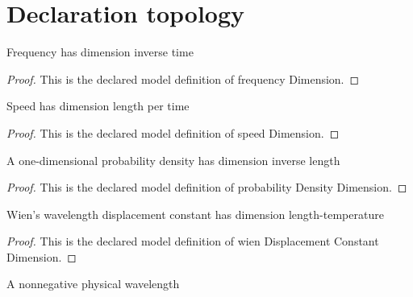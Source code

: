 \section{Declaration topology}
\begin{definition}
  \label{def:physics:phyx-mini-0646:phyxminiproblems-problemphyxmini0646-frequencydimension}
  Frequency has dimension inverse time
\end{definition}
\begin{proof}
  This is the declared model definition of frequency Dimension.
\end{proof}
\begin{definition}
  \label{def:physics:phyx-mini-0646:phyxminiproblems-problemphyxmini0646-speeddimension}
  Speed has dimension length per time
\end{definition}
\begin{proof}
  This is the declared model definition of speed Dimension.
\end{proof}
\begin{definition}
  \label{def:physics:phyx-mini-0646:phyxminiproblems-problemphyxmini0646-probabilitydensitydimension}
  A one-dimensional probability density has dimension inverse length
\end{definition}
\begin{proof}
  This is the declared model definition of probability Density Dimension.
\end{proof}
\begin{definition}
  \label{def:physics:phyx-mini-0646:phyxminiproblems-problemphyxmini0646-wiendisplacementconstantdimension}
  Wien's wavelength displacement constant has dimension length-temperature
\end{definition}
\begin{proof}
  This is the declared model definition of wien Displacement Constant Dimension.
\end{proof}
\begin{definition}
  \label{def:physics:phyx-mini-0646:phyxminiproblems-problemphyxmini0646-wavelengthquantity}
  A nonnegative physical wavelength
\end{definition}
